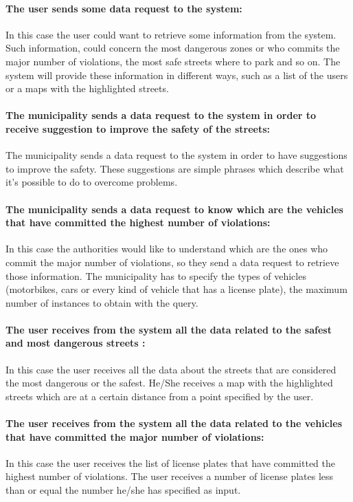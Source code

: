 \documentclass[titlepage]{article}
\begin{document}
\paragraph{The user sends some data request to the system: }
In this case the user could want to retrieve some information from the system. Such information, could concern the most dangerous zones or who commits the major number of violations, the most safe streets where to park and so on. The system will provide these information in different ways, such as a list of the users or a maps with the highlighted streets.
\paragraph{The municipality sends a data request to the 				   system  in order to receive suggestion to improve 			   the 	safety 	of the streets: }
The municipality sends a data request to the system in order to have suggestions to improve the safety. These suggestions are simple phrases which describe what it's possible to do to overcome problems.
\paragraph{The municipality sends a data request to know which 		   are the vehicles that have committed the highest 	         		  number of violations: }
In this case the authorities would like to understand which are the ones who commit the major number of violations, so they send a data request to retrieve those information. The municipality has to specify the types of vehicles (motorbikes, cars or every kind of vehicle that has a license plate), the maximum number of instances to obtain with the query.
\paragraph{The user receives from the system all the data 			related to the safest and most dangerous streets : }
In this case the user receives all the data about the streets that are considered the most dangerous or the safest. He/She receives a map with the highlighted streets which are at a certain distance from a point specified by the user.
\paragraph{The user receives from the system all the data related to the vehicles that have committed the major number of violations:}
In this case the user receives the list of license plates that have committed the highest number of violations. The user receives a number of license plates less than or equal the number he/she has specified as input.
\end{document}

